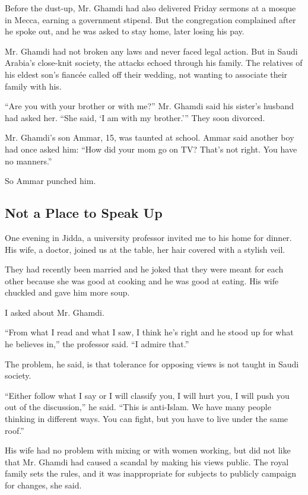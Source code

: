 Before the dust-up, Mr. Ghamdi had also delivered Friday sermons at a
mosque in Mecca, earning a government stipend. But the congregation
complained after he spoke out, and he was asked to stay home, later
losing his pay.

Mr. Ghamdi had not broken any laws and never faced legal action. But in
Saudi Arabia's close-knit society, the attacks echoed through his
family. The relatives of his eldest son's fiancée called off their
wedding, not wanting to associate their family with his.

``Are you with your brother or with me?'' Mr. Ghamdi said his sister's
husband had asked her. ``She said, `I am with my brother.''' They soon
divorced.

Mr. Ghamdi's son Ammar, 15, was taunted at school. Ammar said another
boy had once asked him: ``How did your mom go on TV? That's not right.
You have no manners.''

So Ammar punched him.

\hypertarget{not-a-place-to-speak-up}{%
\subsection{Not a Place to Speak Up}\label{not-a-place-to-speak-up}}

One evening in Jidda, a university professor invited me to his home for
dinner. His wife, a doctor, joined us at the table, her hair covered
with a stylish veil.

They had recently been married and he joked that they were meant for
each other because she was good at cooking and he was good at eating.
His wife chuckled and gave him more soup.

I asked about Mr. Ghamdi.

``From what I read and what I saw, I think he's right and he stood up
for what he believes in,'' the professor said. ``I admire that.''

The problem, he said, is that tolerance for opposing views is not taught
in Saudi society.

``Either follow what I say or I will classify you, I will hurt you, I
will push you out of the discussion,'' he said. ``This is anti-Islam. We
have many people thinking in different ways. You can fight, but you have
to live under the same roof.''

His wife had no problem with mixing or with women working, but did not
like that Mr. Ghamdi had caused a scandal by making his views public.
The royal family sets the rules, and it was inappropriate for subjects
to publicly campaign for changes, she said.

